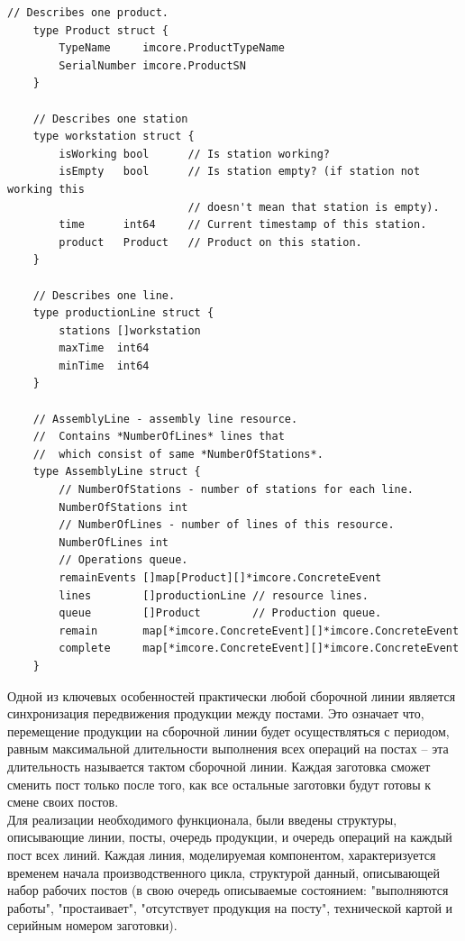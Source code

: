 \begin{lstlisting}[caption={Структуры сборочной линии},label={lst:resource},language=Golang]
	// Describes one product.
	type Product struct {
		TypeName     imcore.ProductTypeName
		SerialNumber imcore.ProductSN
	}

	// Describes one station
	type workstation struct {
		isWorking bool		// Is station working?
		isEmpty   bool		// Is station empty? (if station not working this
							// doesn't mean that station is empty).
		time      int64		// Current timestamp of this station.
		product   Product 	// Product on this station.
	}

	// Describes one line.
	type productionLine struct {
		stations []workstation
		maxTime  int64
		minTime  int64
	}

	// AssemblyLine - assembly line resource.
	//	Contains *NumberOfLines* lines that
	//	which consist of same *NumberOfStations*.
	type AssemblyLine struct {
		// NumberOfStations - number of stations for each line.
		NumberOfStations int
		// NumberOfLines - number of lines of this resource.
		NumberOfLines int
		// Operations queue.
		remainEvents []map[Product][]*imcore.ConcreteEvent
		lines        []productionLine // resource lines.
		queue        []Product        // Production queue.
		remain       map[*imcore.ConcreteEvent][]*imcore.ConcreteEvent
		complete     map[*imcore.ConcreteEvent][]*imcore.ConcreteEvent
	}
\end{lstlisting}

\indent Одной из ключевых особенностей практически любой сборочной линии является синхронизация передвижения продукции между постами.
Это означает что, перемещение продукции на сборочной линии будет осуществляться с периодом, равным максимальной длительности выполнения всех операций на постах -- эта длительность называется тактом сборочной линии.
Каждая заготовка сможет сменить пост только после того, как все остальные заготовки будут готовы к смене своих постов.\\
\indent Для реализации необходимого функционала, были введены структуры, описывающие линии, посты, очередь продукции, и очередь операций на каждый пост всех линий.
Каждая линия, моделируемая компонентом, характеризуется временем начала производственного цикла, структурой данный, описывающей набор рабочих постов (в свою очередь описываемые состоянием: "выполняются работы", "простаивает", "отсутствует продукция на посту", технической картой и серийным номером заготовки).

